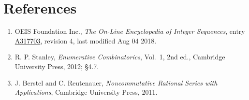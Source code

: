 \documentclass[11pt]{article}
\theoremstyle{definition}
\begin{document}
\section{References}

\begin{enumerate}

\item OEIS Foundation Inc., \emph{The On-Line Encyclopedia of Integer Sequences}, entry \href{https://oeis.org/A317703}{A317703}, revision 4, last modified Aug 04 2018.

\item R. P. Stanley, \emph{Enumerative Combinatorics}, Vol.~1, 2nd ed., Cambridge University Press, 2012; \S4.7.

\item J. Berstel and C. Reutenauer, \emph{Noncommutative Rational Series with Applications}, Cambridge University Press, 2011.

\end{enumerate}
\end{document}
